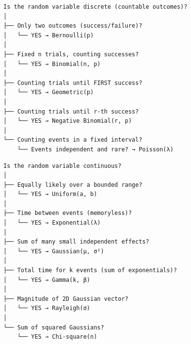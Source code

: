 \begin{Shaded}
\begin{Highlighting}[]
\NormalTok{(}\OperatorTok{,} \OperatorTok{,} \NormalTok{(}\NormalTok{))}\OperatorTok{;}
\NormalTok{(}\OperatorTok{,} \OperatorTok{*}\OperatorTok{,} \NormalTok{(}\NormalTok{))}\OperatorTok{;}
\end{Highlighting}
\end{Shaded}




\begin{PSplaincode}
\begin{Verbatim}
Is the random variable discrete (countable outcomes)?
│
├── Only two outcomes (success/failure)?
│   └── YES → Bernoulli(p)
│
├── Fixed n trials, counting successes?
│   └── YES → Binomial(n, p)
│
├── Counting trials until FIRST success?
│   └── YES → Geometric(p)
│
├── Counting trials until r-th success?
│   └── YES → Negative Binomial(r, p)
│
└── Counting events in a fixed interval?
    └── Events independent and rare? → Poisson(λ)
\end{Verbatim}
\end{PSplaincode}



\begin{PSplaincode}
\begin{Verbatim}
Is the random variable continuous?
│
├── Equally likely over a bounded range?
│   └── YES → Uniform(a, b)
│
├── Time between events (memoryless)?
│   └── YES → Exponential(λ)
│
├── Sum of many small independent effects?
│   └── YES → Gaussian(μ, σ²)
│
├── Total time for k events (sum of exponentials)?
│   └── YES → Gamma(k, β)
│
├── Magnitude of 2D Gaussian vector?
│   └── YES → Rayleigh(σ)
│
└── Sum of squared Gaussians?
    └── YES → Chi-square(n)
\end{Verbatim}
\end{PSplaincode}


